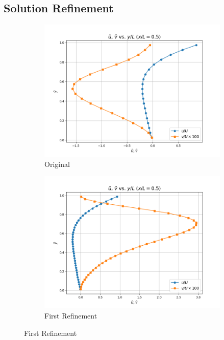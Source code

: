 \documentclass[11pt]{article}
\begin{document}
\subsection{Solution Refinement}
\begin{figure}[H]
   \centering
   \begin{subfigure}{0.495\linewidth}
      \includegraphics[width=\textwidth]{images/Velocity_Component_Plot_for_gridsize_20x20.png}
      \caption{Original}
   \end{subfigure}
   \begin{subfigure}{0.495\linewidth}
      \includegraphics[width=\textwidth]{images/Velocity_Component_Plot_for_gridsize_40x40.png}
      \caption{First Refinement}
   \end{subfigure}
   \vspace{5mm}


\end{figure}
\end{document}
